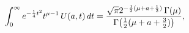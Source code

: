\[\int_{0}^{\infty}e^{-\frac{1}{4}t^{2}}t^{\mu-1}\mathop{U\/}\nolimits\!\left(a,%
t\right)dt=\frac{\sqrt{\pi}2^{-\frac{1}{2}(\mu+a+\frac{1}{2})}\mathop{\Gamma\/%
}\nolimits\!\left(\mu\right)}{\mathop{\Gamma\/}\nolimits\!\left(\frac{1}{2}(%
\mu+a+\frac{3}{2})\right)},\]